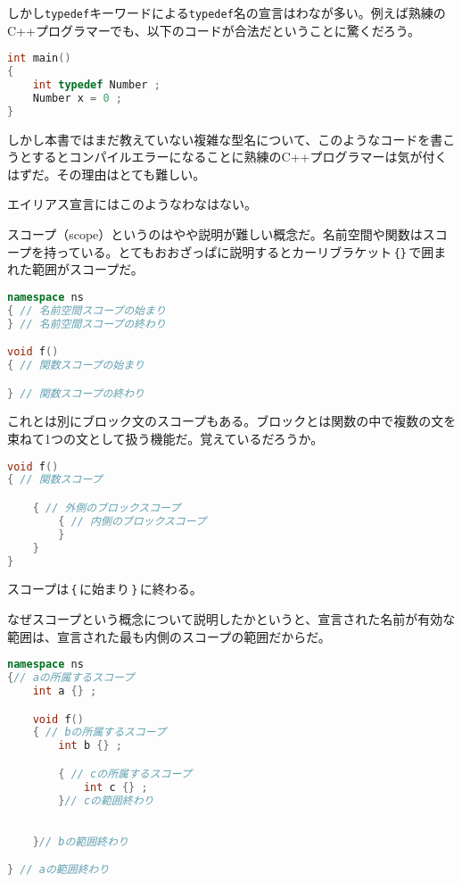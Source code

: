 しかし\texttt{typedef}キーワードによる\texttt{typedef}名の宣言はわなが多い。例えば熟練のC++プログラマーでも、以下のコードが合法だということに驚くだろう。

\begin{lstlisting}[language={C++}]
int main()
{
    int typedef Number ;
    Number x = 0 ;
}
\end{lstlisting}

しかし本書ではまだ教えていない複雑な型名について、このようなコードを書こうとするとコンパイルエラーになることに熟練のC++プログラマーは気が付くはずだ。その理由はとても難しい。

エイリアス宣言にはこのようなわなはない。


スコープ（scope）というのはやや説明が難しい概念だ。名前空間や関数はスコープを持っている。とてもおおざっぱに説明するとカーリブラケット\,\texttt{\{\}}\,で囲まれた範囲がスコープだ。

\begin{lstlisting}[language={C++}]
namespace ns
{ // 名前空間スコープの始まり
} // 名前空間スコープの終わり

void f()
{ // 関数スコープの始まり

} // 関数スコープの終わり
\end{lstlisting}

これとは別にブロック文のスコープもある。ブロックとは関数の中で複数の文を束ねて1つの文として扱う機能だ。覚えているだろうか。

\begin{lstlisting}[language={C++}]
void f()
{ // 関数スコープ

    { // 外側のブロックスコープ
        { // 内側のブロックスコープ
        }
    }
}
\end{lstlisting}

スコープは\,\texttt{\{}\,に始まり\,\texttt{\}}\,に終わる。

なぜスコープという概念について説明したかというと、宣言された名前が有効な範囲は、宣言された最も内側のスコープの範囲だからだ。

\begin{lstlisting}[language={C++}]
namespace ns
{// aの所属するスコープ
    int a {} ;

    void f()
    { // bの所属するスコープ
        int b {} ;

        { // cの所属するスコープ
            int c {} ;
        }// cの範囲終わり

        
    }// bの範囲終わり

} // aの範囲終わり
\end{lstlisting}

